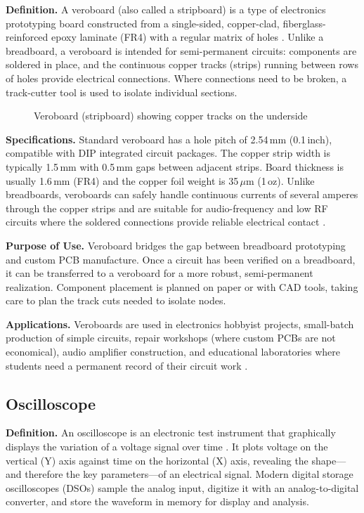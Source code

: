 \documentclass[12pt, a4paper, twoside]{report}
\newcommand{\imgplaceholder}[2]{%
  \begin{figure}[H]
    \centering
    \fcolorbox{gray!60}{gray!12}{%
      \parbox[c][5cm][c]{0.65\textwidth}{%
        \centering
        \textcolor{gray!80}{\Large [Image Placeholder]}\\[6pt]
        \textcolor{gray}{\small Insert figure here}
      }%
    }
    \caption{#1}
    \label{fig:#2}
  \end{figure}
}
\begin{document}
\textbf{Definition.}\quad
A veroboard (also called a stripboard) is a type of electronics prototyping board
constructed from a single-sided, copper-clad, fiberglass-reinforced epoxy laminate
(FR4) with a regular matrix of holes \cite{wiki:breadboard}. Unlike a breadboard,
a veroboard is intended for semi-permanent circuits: components are soldered in place,
and the continuous copper tracks (strips) running between rows of holes provide electrical
connections. Where connections need to be broken, a track-cutter tool is used to isolate
individual sections.

\imgplaceholder{Veroboard (stripboard) showing copper tracks on the underside}{veroboard}

\textbf{Specifications.}\quad
Standard veroboard has a hole pitch of 2.54\,mm (0.1\,inch), compatible with DIP
integrated circuit packages. The copper strip width is typically 1.5\,mm with 0.5\,mm
gaps between adjacent strips. Board thickness is usually 1.6\,mm (FR4) and the copper
foil weight is 35\,$\mu$m (1\,oz). Unlike breadboards, veroboards can safely handle
continuous currents of several amperes through the copper strips and are suitable for
audio-frequency and low RF circuits where the soldered connections provide reliable
electrical contact \cite{analog:breadboard}.

\textbf{Purpose of Use.}\quad
Veroboard bridges the gap between breadboard prototyping and custom PCB manufacture.
Once a circuit has been verified on a breadboard, it can be transferred to a veroboard
for a more robust, semi-permanent realization. Component placement is planned on paper
or with CAD tools, taking care to plan the track cuts needed to isolate nodes.

\textbf{Applications.}\quad
Veroboards are used in electronics hobbyist projects, small-batch production of simple
circuits, repair workshops (where custom PCBs are not economical), audio amplifier
construction, and educational laboratories where students need a permanent record of
their circuit work \cite{boylestad2015}.

\subsection{Oscilloscope}

\textbf{Definition.}\quad
An oscilloscope is an electronic test instrument that graphically displays the variation
of a voltage signal over time \cite{wiki:oscilloscope}. It plots voltage on the vertical
(Y) axis against time on the horizontal (X) axis, revealing the shape---and therefore
the key parameters---of an electrical signal. Modern digital storage oscilloscopes (DSOs)
sample the analog input, digitize it with an analog-to-digital converter, and store the
waveform in memory for display and analysis.
\end{document}
